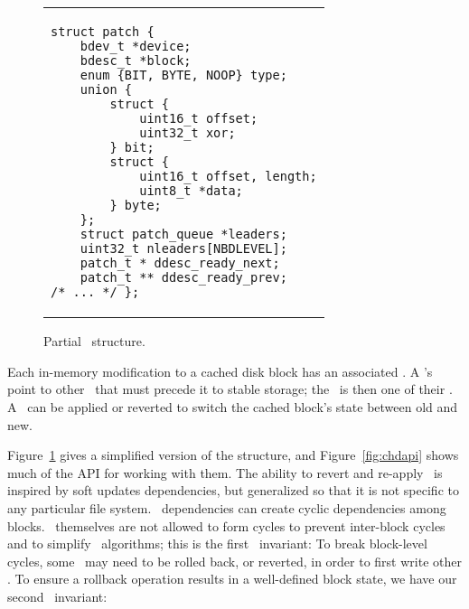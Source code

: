 \section {\ChDescs}
\label{sec:chdescs}

\begin{figure}[t]
\vskip-14pt
\begin{tabular}{@{\hskip0.58in}p{2in}@{}}
\begin{scriptsize}
\begin{verbatim}
struct patch {
    bdev_t *device;
    bdesc_t *block;
    enum {BIT, BYTE, NOOP} type;
    union {
        struct {
            uint16_t offset;
            uint32_t xor;
        } bit;
        struct {
            uint16_t offset, length;
            uint8_t *data;
        } byte;
    };
    struct patch_queue *leaders;
    uint32_t nleaders[NBDLEVEL];
    patch_t * ddesc_ready_next;
    patch_t ** ddesc_ready_prev;
/* ... */ };
\end{verbatim}
\end{scriptsize}
\end{tabular}
\vspace{-10pt}
\caption{\label{fig:chdesc} Partial \chdesc\ structure.}
\end{figure}

Each in-memory modification to a cached disk block has an associated
\chdesc.
%
A \chdesc's \emph{\befores} point to other \chdescs\ that must precede it to
stable storage; the \chdesc\ is then one of their \emph{\afters}. A \chdesc\ can
be applied or reverted to switch the cached block's state between old and new.

Figure~\ref{fig:chdesc} gives a simplified version of the structure, and
Figure~\ref{fig:chdapi} shows much of the API for working with them.
%
The ability
to revert and re-apply \chdescs\ is inspired by soft updates dependencies, but
generalized so that it is not specific to any particular file system.
%
\Chdesc\ dependencies can create cyclic dependencies among
blocks. \Chdescs\ themselves are not allowed to form cycles
to prevent inter-block cycles and to simplify \chdesc\ algorithms;
this is the first \chdesc\ invariant:
%
To break block-level cycles, some \chdescs\ may need to be rolled
back, or reverted, in order to first write other \chdescs. To ensure a
rollback operation results in a well-defined block state, we have our
second \chdesc\ invariant: 

